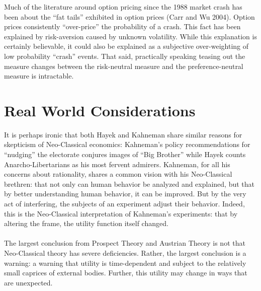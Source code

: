 \documentclass{article}
\theoremstyle{definition}
\begin{document}
Much of the literature around option pricing since the 1988 market crash has been about the ``fat tails'' exhibited in option prices (Carr and Wu 2004).  Option prices consistently ``over-price'' the probability of a crash.  This fact has been explained by risk-aversion caused by unknown volatility.  While this explanation is certainly believable, it could also be explained as a subjective over-weighting of low probability ``crash'' events.  That said, practically speaking teasing out the measure changes between the risk-neutral measure and the preference-neutral measure is intractable.  

\section{Real World Considerations}

It is perhaps ironic that both Hayek and Kahneman share similar reasons for skepticism of Neo-Classical economics: Kahneman's policy recommendations for ``nudging'' the electorate conjures images of ``Big Brother'' while Hayek counts Anarcho-Libertarians as his most fervent admirers.  Kahneman, for all his concerns about rationality, shares a common vision with his Neo-Classical brethren: that not only can human behavior be analyzed and explained, but that by better understanding human behavior, it can be improved. But by the very act of interfering, the subjects of an experiment adjust their behavior.  Indeed, this is the Neo-Classical interpretation of Kahneman's experiments: that by altering the frame, the utility function itself changed.  
\\
\\
The largest conclusion from Prospect Theory and Austrian Theory is not that Neo-Classical theory has severe deficiencies.  Rather, the largest conclusion is a warning: a warning that utility is time-dependent and subject to the relatively small caprices of external bodies.  Further, this utility may change in ways that are unexpected.  	
	
	
\end{document}
